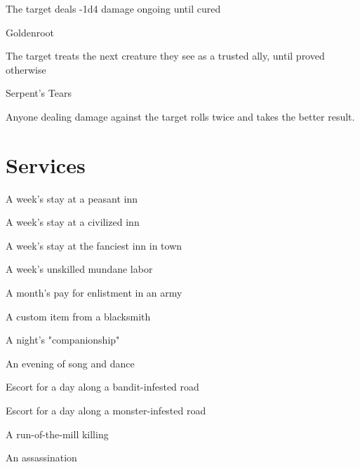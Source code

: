  

The target deals -1d4 damage ongoing until cured

 

Goldenroot	 

 

The target treats the next creature they see as a trusted ally, until proved otherwise

 

Serpent's Tears	 

 

Anyone dealing damage against the target rolls twice and takes the better result.

 
\section{Services}   
 

A week's stay at a peasant inn	 

 

A week's stay at a civilized inn	 

 

A week's stay at the fanciest inn in town	 

 

A week's unskilled mundane labor	 

 

A month's pay for enlistment in an army	 

 

A custom item from a blacksmith	 

 

A night's "companionship"	 

 

An evening of song and dance	 

 

Escort for a day along a bandit-infested road	 

 

Escort for a day along a monster-infested road	 

 

A run-of-the-mill killing	 

 

An assassination	 

